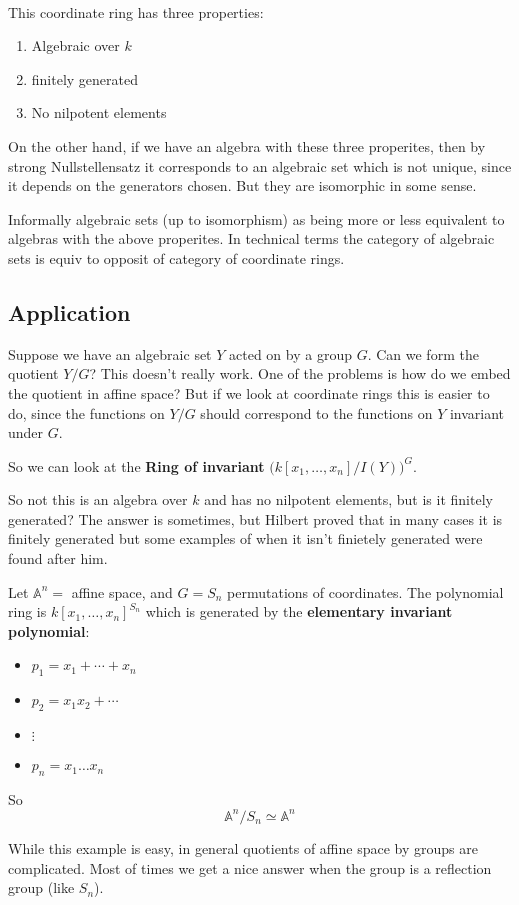 \

This coordinate ring has three properties:\begin{enumerate}
    \item Algebraic over $k$
    \item finitely generated
    \item No nilpotent elements
\end{enumerate}

On the other hand, if we have an algebra with these three properites, then by strong Nullstellensatz it corresponds to an algebraic set which is not unique, since it depends on the generators chosen. But they are isomorphic in some sense.


Informally algebraic sets (up to isomorphism) as being more or less equivalent to algebras with the above properites. In technical terms the category of algebraic sets is equiv to opposit of category of coordinate rings.

\subsection{Application}
Suppose we have an algebraic set $Y$ acted on by a group $G$. Can we form the quotient $Y/G$? This doesn't really work. One of the problems is how do we embed the quotient in affine space? But if we look at coordinate rings this is easier to do, since the functions on $Y/G$ should correspond to the functions on $Y$ invariant under $G$.
\begin{center}
    So we can look at the \textbf{Ring of invariant} ${\bigg(k[x_1,\dots,x_n]/I(Y)\bigg)}^G$.     
\end{center}
So not this is an algebra over $k$ and has no nilpotent elements, but is it finitely generated? The answer is sometimes, but Hilbert proved that in many cases it is finitely generated but some examples of when it isn't finietely generated were found after him.


\begin{example}
    Let $\mathbb{A}^n =$ affine space, and $G  = S_n$ permutations of coordinates. The polynomial ring is ${k[x_1,\dots,x_n]}^{S_n}$ which is generated by the \textbf{elementary invariant polynomial}:\begin{itemize}
        \item $p_1 = x_1+\cdots + x_n$
        \item $p_2 = x_1x_2+\cdots$
        \item $\vdots$
        \item $p_n = x_1\dots x_n$
    \end{itemize}

    So \[\mathbb{A}^n/S_n \simeq \mathbb{A}^n\]

    While this example is easy, in general quotients of affine space by groups are complicated. Most of times we get a nice answer when the group is a reflection group (like $S_n$).
\end{example}

